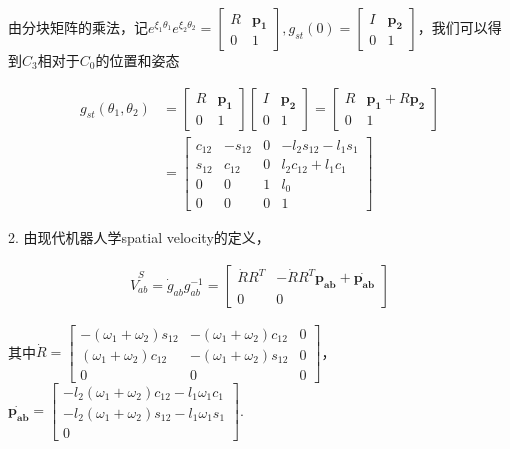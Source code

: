 \documentclass{ctexart}
\begin{document}
由分块矩阵的乘法，记$e^{\xi_1 \theta_1}e^{\xi_2 \theta_2} = \begin{bmatrix}
	R & \boldsymbol{p_1} \\
	0 & 1
\end{bmatrix},g_{st}(0)=\begin{bmatrix}
	I & \boldsymbol{p_2} \\
	0 & 1
\end{bmatrix}$，我们可以得到$C_3$相对于$C_0$的位置和姿态

\begin{equation*}
	\begin{aligned}
		g_{st}(\theta_1,\theta_2) &= \begin{bmatrix}
			R & \boldsymbol{p_1}  \\
			0 & 1
		\end{bmatrix} \begin{bmatrix}
			I & \boldsymbol{p_2} \\
			0 & 1
		\end{bmatrix}
		= \begin{bmatrix}
			R & \boldsymbol{p_1} +R\boldsymbol{p_2}  \\
			0 & 1
		\end{bmatrix}\\
		&= \begin{bmatrix}
			c_{12} & -s_{12} & 0 & -l_2s_{12}-l_1s_1 \\
			s_{12} & c_{12} & 0 & l_2c_{12}+l_1c_1\\
			0 & 0 & 1 & l_0 \\
			0 & 0 & 0 & 1
		\end{bmatrix}
	\end{aligned}
\end{equation*}

2. 由现代机器人学spatial velocity的定义，

\begin{equation*}
	\begin{aligned}
		\hat{V}^S_{ab}= \dot{g}_{ab}g_{ab}^{-1} = \begin{bmatrix}
			\dot{R}R^T & -\dot{R}R^T\boldsymbol{p_{ab}}+\dot{\boldsymbol{p_{ab}}} \\
			0 & 0
		\end{bmatrix}
	\end{aligned}
\end{equation*}

其中$\dot{R} = \begin{bmatrix}
	-(\omega_1 + \omega_2)s_{12} & -(\omega_1 + \omega_2)c_{12} & 0 \\
	(\omega_1 + \omega_2)c_{12} & -(\omega_1 + \omega_2)s_{12} & 0 \\
	0 & 0 & 0
\end{bmatrix}$，$\dot{\boldsymbol{p_{ab}}} = \begin{bmatrix}
	-l_2(\omega_1 + \omega_2)c_{12} - l_1\omega_1c_1 \\
	-l_2(\omega_1 + \omega_2)s_{12} - l_1\omega_1s_1 \\
	0
\end{bmatrix}$.
\end{document}
